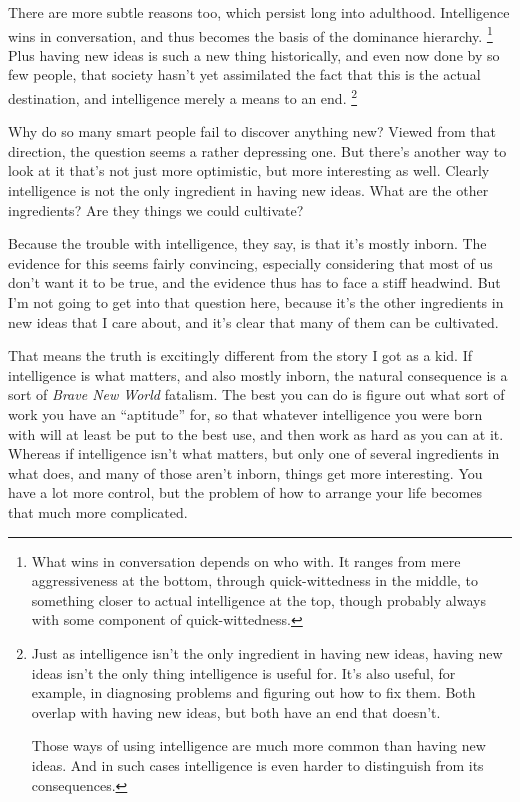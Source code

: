 \documentclass[12pt]{book}
\begin{document}
There are more subtle reasons too, which persist long into adulthood.
Intelligence wins in conversation, and thus becomes the basis of the
dominance hierarchy. \footnote{What wins in conversation depends on who with. It ranges from
mere aggressiveness at the bottom, through quick-wittedness in the
middle, to something closer to actual intelligence at the top, though
probably always with some component of quick-wittedness.} Plus having new ideas is
such a new thing historically, and even now done by so few people, that
society hasn't yet assimilated the fact that this is the actual
destination, and intelligence merely a means to an end.
\footnote{Just as intelligence isn't the only ingredient in having new
ideas, having new ideas isn't the only thing intelligence is useful for.
It's also useful, for example, in diagnosing problems and figuring out
how to fix them. Both overlap with having new ideas, but both have an
end that doesn't.

Those ways of using intelligence are much more common than having new
ideas. And in such cases intelligence is even harder to distinguish from
its consequences.}

Why do so many smart people fail to discover anything new? Viewed from
that direction, the question seems a rather depressing one. But there's
another way to look at it that's not just more optimistic, but more
interesting as well. Clearly intelligence is not the only ingredient in
having new ideas. What are the other ingredients? Are they things we
could cultivate?

Because the trouble with intelligence, they say, is that it's mostly
inborn. The evidence for this seems fairly convincing, especially
considering that most of us don't want it to be true, and the evidence
thus has to face a stiff headwind. But I'm not going to get into that
question here, because it's the other ingredients in new ideas that I
care about, and it's clear that many of them can be cultivated.

That means the truth is excitingly different from the story I got as a
kid. If intelligence is what matters, and also mostly inborn, the
natural consequence is a sort of \emph{Brave New World} fatalism. The
best you can do is figure out what sort of work you have an ``aptitude''
for, so that whatever intelligence you were born with will at least be
put to the best use, and then work as hard as you can at it. Whereas if
intelligence isn't what matters, but only one of several ingredients in
what does, and many of those aren't inborn, things get more interesting.
You have a lot more control, but the problem of how to arrange your life
becomes that much more complicated.
\end{document}
